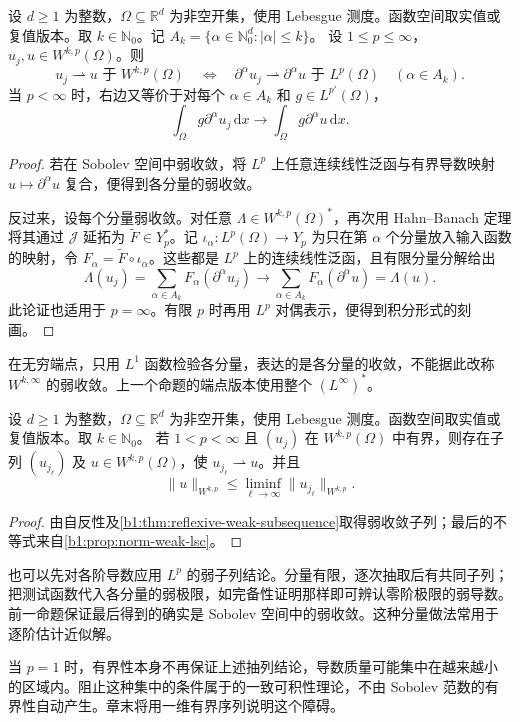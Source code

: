 \begin{proposition}\label{b1:prop:sobolev-weak-components}
设 \(d\geq1\) 为整数，\(\Omega\subseteq\mathbb R^d\) 为非空开集，使用 Lebesgue 测度。函数空间取实值或复值版本。取 \(k\in\mathbb N_0\)。记 \(A_k=\{\alpha\in\mathbb N_0^d:|\alpha|\leq k\}\)。
设 \(1\leq p\leq\infty\)，\(u_j,u\in W^{k,p}(\Omega)\)。则
\[
 u_j\rightharpoonup u\text{ 于 }W^{k,p}(\Omega)
 \quad\Longleftrightarrow\quad
 \partial^\alpha u_j\rightharpoonup\partial^\alpha u
 \text{ 于 }L^p(\Omega)\quad(\alpha\in A_k).
\]
当 \(p<\infty\) 时，右边又等价于对每个 \(\alpha\in A_k\) 和 \(g\in L^{p'}(\Omega)\)，
\[
 \int_\Omega g\partial^\alpha u_j\,\mathrm dx
 \longrightarrow\int_\Omega g\partial^\alpha u\,\mathrm dx.
\]
\end{proposition}
\begin{proof}
若在 Sobolev 空间中弱收敛，将 \(L^p\) 上任意连续线性泛函与有界导数映射 \(u\mapsto\partial^\alpha u\) 复合，便得到各分量的弱收敛。

反过来，设每个分量弱收敛。对任意 \(\Lambda\in W^{k,p}(\Omega)^*\)，再次用 Hahn--Banach 定理将其通过 \(\mathcal J\) 延拓为 \(\widetilde F\in Y_p^*\)。记 \(\iota_\alpha:L^p(\Omega)\to Y_p\) 为只在第 \(\alpha\) 个分量放入输入函数的映射，令 \(F_\alpha=\widetilde F\circ\iota_\alpha\)。这些都是 \(L^p\) 上的连续线性泛函，且有限分量分解给出
\[
 \Lambda(u_j)=\sum_{\alpha\in A_k}F_\alpha(\partial^\alpha u_j)
 \longrightarrow\sum_{\alpha\in A_k}F_\alpha(\partial^\alpha u)
 =\Lambda(u).
\]
此论证也适用于 \(p=\infty\)。有限 \(p\) 时再用 \(L^p\) 对偶表示，便得到积分形式的刻画。
\end{proof}

在无穷端点，只用 \(L^1\) 函数检验各分量，表达的是各分量的\WeakStar{}收敛，不能据此改称 \(W^{k,\infty}\) 的弱收敛。上一个命题的端点版本使用整个 \((L^\infty)^*\)。

\begin{corollary}\label{b1:cor:sobolev-weak-subsequence}
设 \(d\geq1\) 为整数，\(\Omega\subseteq\mathbb R^d\) 为非空开集，使用 Lebesgue 测度。函数空间取实值或复值版本。取 \(k\in\mathbb N_0\)。
若 \(1<p<\infty\) 且 \((u_j)\) 在 \(W^{k,p}(\Omega)\) 中有界，则存在子列 \((u_{j_\ell})\) 及 \(u\in W^{k,p}(\Omega)\)，使 \(u_{j_\ell}\rightharpoonup u\)。并且
\[
 \|u\|_{W^{k,p}}\leq\liminf_{\ell\to\infty}\|u_{j_\ell}\|_{W^{k,p}}.
\]
\end{corollary}
\begin{proof}
由自反性及\cref{b1:thm:reflexive-weak-subsequence}取得弱收敛子列；最后的不等式来自\cref{b1:prop:norm-weak-lsc}。
\end{proof}

也可以先对各阶导数应用 \(L^p\) 的弱子列结论。分量有限，逐次抽取后有共同子列；把测试函数代入各分量的弱极限，如完备性证明那样即可辨认零阶极限的弱导数。前一命题保证最后得到的确实是 Sobolev 空间中的弱收敛。这种分量做法常用于逐阶估计近似解。

\ProseParagraphBreak

当 \(p=1\) 时，有界性本身不再保证上述抽列结论，导数质量可能集中在越来越小的区域内。阻止这种集中的条件属于的一致可积性理论，不由 Sobolev 范数的有界性自动产生。章末将用一维有界序列说明这个障碍。
